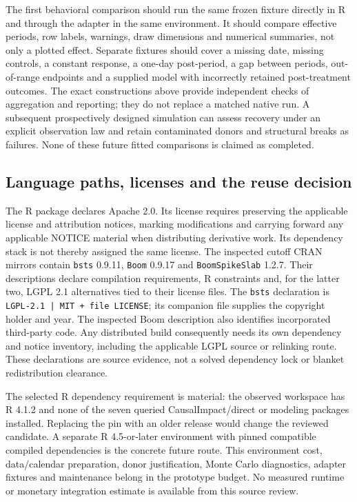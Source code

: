 The first behavioral comparison should run the same frozen fixture directly
in R and through the adapter in the same environment. It should compare
effective periods, row labels, warnings, draw dimensions and numerical
summaries, not only a plotted effect. Separate fixtures should cover a missing
date, missing controls, a constant response, a one-day post-period, a gap
between periods, out-of-range endpoints and a supplied model with incorrectly
retained post-treatment outcomes. The exact constructions above provide
independent checks of aggregation and reporting; they do not replace a
matched native run. A subsequent prospectively designed simulation can
assess recovery under an explicit observation law and retain contaminated
donors and structural breaks as failures. None of these future fitted
comparisons is claimed as completed. \cite{exec13_ci_reuse}

\subsection{Language paths, licenses and the reuse decision}

The R package declares Apache 2.0. Its license requires preserving the
applicable license and attribution notices, marking modifications and
carrying forward any applicable NOTICE material when distributing derivative
work. Its dependency stack is not thereby assigned the same license. The
inspected cutoff CRAN mirrors contain \texttt{bsts} 0.9.11,
\texttt{Boom} 0.9.17 and \texttt{BoomSpikeSlab} 1.2.7. Their descriptions
declare compilation requirements, R constraints and, for the latter two,
LGPL 2.1 alternatives tied to their license files. The \texttt{bsts}
declaration is \texttt{LGPL-2.1 | MIT + file LICENSE}; its companion file
supplies the copyright holder and year. The inspected Boom description also
identifies incorporated third-party code. Any distributed build consequently
needs its own dependency and notice inventory, including the applicable
LGPL source or relinking route. These declarations are source evidence, not
a solved dependency lock or blanket redistribution clearance.
\cite{exec13_ci_r,exec13_ci_dependencies}

The selected R dependency requirement is material: the observed workspace
has R 4.1.2 and none of the seven queried CausalImpact/direct or modeling
packages installed. Replacing the pin with an older release would change
the reviewed candidate. A separate R 4.5-or-later environment with pinned
compatible compiled dependencies is the concrete future route. This
environment cost, data/calendar preparation, donor justification, Monte
Carlo diagnostics, adapter fixtures and maintenance belong in the prototype
budget. No measured runtime or monetary integration estimate is available
from this source review. \cite{exec13_ci_reuse,exec13_ci_dependencies}

